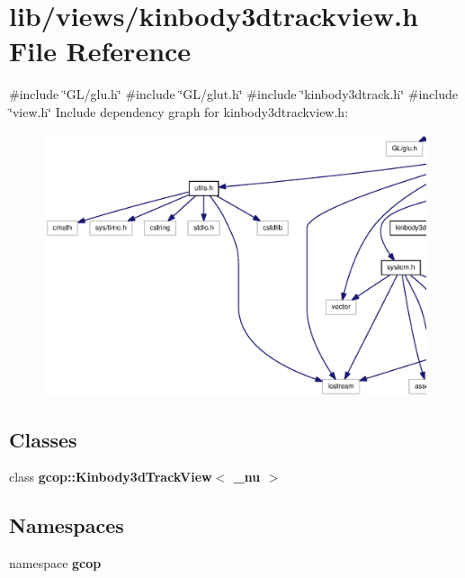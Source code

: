 \section{lib/views/kinbody3dtrackview.h \-File \-Reference}
\label{kinbody3dtrackview_8h}
{\ttfamily \#include \char`\"{}\-G\-L/glu.\-h\char`\"{}}\*
{\ttfamily \#include \char`\"{}\-G\-L/glut.\-h\char`\"{}}\*
{\ttfamily \#include \char`\"{}kinbody3dtrack.\-h\char`\"{}}\*
{\ttfamily \#include \char`\"{}view.\-h\char`\"{}}\*
\-Include dependency graph for kinbody3dtrackview.\-h\-:
\nopagebreak
\begin{figure}[H]
\begin{center}
\leavevmode
\includegraphics[width=350pt]{kinbody3dtrackview_8h__incl}
\end{center}
\end{figure}
\subsection*{\-Classes}
\begin{DoxyCompactItemize}
\item 
class {\bf gcop\-::\-Kinbody3d\-Track\-View$<$ \-\_\-nu $>$}
\end{DoxyCompactItemize}
\subsection*{\-Namespaces}
\begin{DoxyCompactItemize}
\item 
namespace {\bf gcop}
\end{DoxyCompactItemize}
